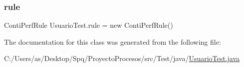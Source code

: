 \subsubsection{\texorpdfstring{rule}{rule}}
{\footnotesize\ttfamily Conti\+Perf\+Rule Usuario\+Test.\+rule = new Conti\+Perf\+Rule()}



The documentation for this class was generated from the following file\+:\begin{DoxyCompactItemize}
\item 
C\+:/\+Users/as/\+Desktop/\+Spq/\+Proyecto\+Procesos/src/\+Test/java/\mbox{\hyperlink{_usuario_test_8java}{Usuario\+Test.\+java}}\end{DoxyCompactItemize}
